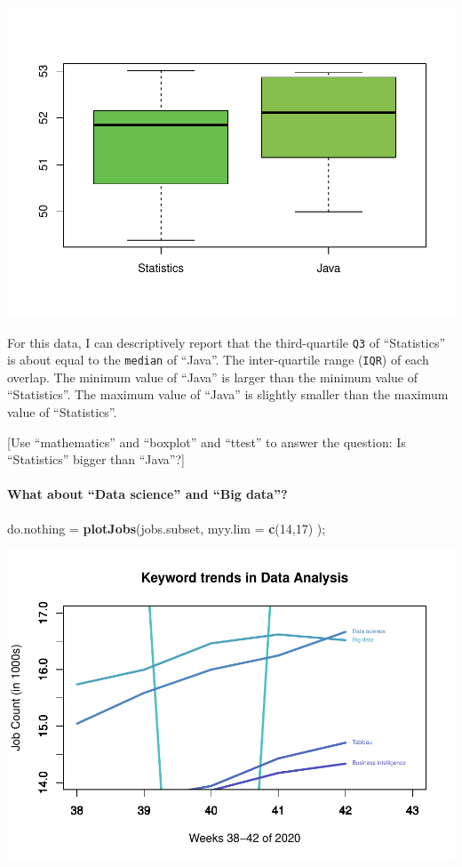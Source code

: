 \documentclass[
]{article}
\newenvironment{Shaded}{\begin{snugshade}}{\end{snugshade}}
\newcommand{\DataTypeTok}[1]{\textcolor[rgb]{0.13,0.29,0.53}{#1}}
\newcommand{\DecValTok}[1]{\textcolor[rgb]{0.00,0.00,0.81}{#1}}
\newcommand{\KeywordTok}[1]{\textcolor[rgb]{0.13,0.29,0.53}{\textbf{#1}}}
\newcommand{\NormalTok}[1]{#1}
\newcommand{\StringTok}[1]{\textcolor[rgb]{0.31,0.60,0.02}{#1}}
\begin{document}
\includegraphics{graphics/chunk-plotting-jobs-trends-statistics-2.pdf}

For this data, I can descriptively report that the third-quartile
\texttt{Q3} of ``Statistics'' is about equal to the \texttt{median} of
``Java''. The inter-quartile range (\texttt{IQR}) of each overlap. The
minimum value of ``Java'' is larger than the minimum value of
``Statistics''. The maximum value of ``Java'' is slightly smaller than
the maximum value of ``Statistics''.

{[}Use ``mathematics'' and ``boxplot'' and ``ttest'' to answer the
question: Is ``Statistics'' bigger than ``Java''?{]}

\hypertarget{what-about-data-science-and-big-data}{%
\paragraph{What about ``Data science'' and ``Big
data''?}\label{what-about-data-science-and-big-data}}

\begin{Shaded}
\begin{Highlighting}[]
\NormalTok{do.nothing =}\StringTok{ }\KeywordTok{plotJobs}\NormalTok{(jobs.subset, }\DataTypeTok{myy.lim =} \KeywordTok{c}\NormalTok{(}\DecValTok{14}\NormalTok{,}\DecValTok{17}\NormalTok{) );}
\end{Highlighting}
\end{Shaded}

\includegraphics{graphics/chunk-plotting-jobs-trends-big-data-1.pdf}
\end{document}
